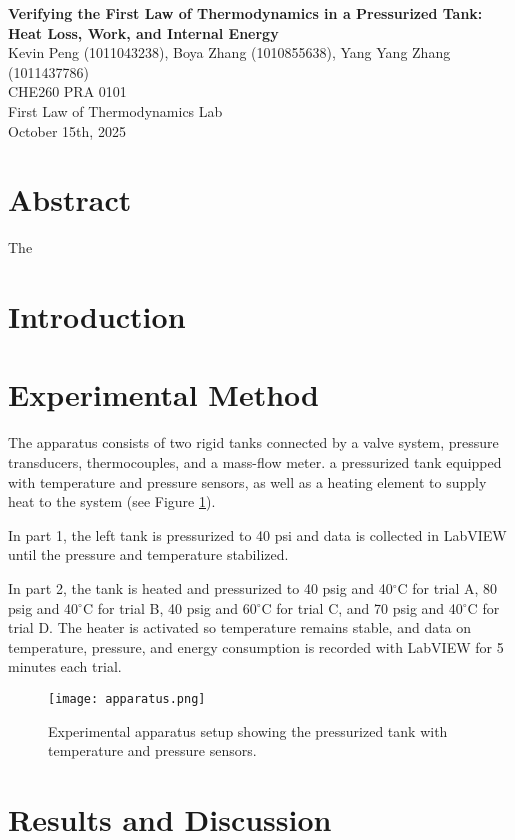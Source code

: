 \documentclass[12pt]{article}
\begin{document}
\begin{center}
\textbf{\Large Verifying the First Law of Thermodynamics in a Pressurized Tank: Heat Loss, Work, and Internal Energy} \\[0.5em]
Kevin Peng (1011043238), Boya Zhang (1010855638), Yang Yang Zhang (1011437786)\\[0.5em]
CHE260 PRA 0101 \\
First Law of Thermodynamics Lab \\
October 15th, 2025 \\
\end{center}

\section*{Abstract}
The 

\section{Introduction}

\section{Experimental Method}
The apparatus consists of two rigid tanks connected by a valve system, pressure transducers, thermocouples, and a mass-flow meter.
a pressurized tank equipped with temperature and pressure sensors, as well as a heating element to supply heat to the system (see Figure \ref{fig:apparatus}).

In part 1, the left tank is pressurized to 40 psi and data is collected in LabVIEW until the pressure and temperature stabilized.

In part 2, the tank is heated and pressurized to 40 psig and 40$^{\circ}$C for trial A, 80 psig and 40$^{\circ}$C for trial B, 40 psig and 60$^{\circ}$C for trial C, and 70 psig and 40$^{\circ}$C for trial D. The heater is activated so temperature remains stable, and data on temperature, pressure, and energy consumption is recorded with LabVIEW for 5 minutes each trial.

\begin{figure}[H]
    \centering
    \texttt{[image: apparatus.png]}
    \caption{Experimental apparatus setup showing the pressurized tank with temperature and pressure sensors.}
    \label{fig:apparatus}
\end{figure}


\section{Results and Discussion}
\end{document}
